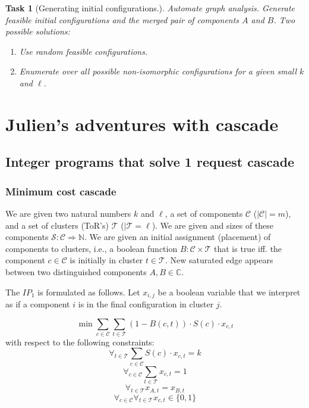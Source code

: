 \documentclass[a4paper,USenglish]{lipics-v2019}
\newtheorem{task}{Task}
\begin{document}
\begin{task}[Generating initial configurations.]

Automate graph analysis. Generate feasible initial configurations and the
merged pair of components $A$ and $B$. Two
possible solutions:
\begin{enumerate}
    \item Use
random feasible configurations.
\item Enumerate over all possible non-isomorphic configurations for a given small $k$
    and $\ell$.
\end{enumerate}
\end{task}


\section{Julien's adventures with cascade}

\subsection{Integer programs that solve 1 request cascade}

\subsubsection{Minimum cost cascade}

We are given two natural numbers $k$ and $\ell$, a set of components $\mathcal{C}$ ($|\mathcal{C}| = m$), and a set of clusters (ToR's) $\mathcal{T}$ ($|\mathcal{T} = \ell$).
We are given and sizes of these components $\mathcal{S} : \mathcal{C} \Rightarrow \mathbb{N}$.
We are given an initial assignment (placement) of components to clusters, i.e., a boolean function $B : \mathcal{C} \times \mathcal{T}$ that is true iff. the component $c \in \mathcal{C}$ is initially in cluster $t \in \mathcal{T}$.
New saturated edge appears between two distinguished components $A, B \in \mathbb{C}$.

The $IP_1$ is formulated as follows.
Let $x_{i,j}$ be a boolean variable that we interpret as if a component $i$ is in the final configuration in cluster $j$.

\[
    \min \sum_{c \in \mathcal{C}} \sum_{t \in \mathcal{T}} (1-B(c, t)) \cdot S(c) \cdot x_{c,t} 
\]
with respect to the following constraints:
\begin{equation}
  \forall_{t\in \mathcal{T}} \sum_{c \in \mathcal{C}} S(c) \cdot x_{c,t} = k
  \label{eq:capacity-constraints-ip1}
\end{equation}
\begin{equation}
    \forall_{c\in \mathcal{C}} \sum_{t \in \mathcal{T}} x_{c,t} = 1
    \label{eq:constraint-single-placement-ip1}
\end{equation}
\begin{equation}
    \forall_{t \in \mathcal{T}} x_{A,t} = x_{B, t}
    \label{eq:constraint-merge-ip1}
\end{equation}
\begin{equation}
    \forall_{c\in \mathcal{C}} \forall_{t\in \mathcal{T}} x_{c, t} \in \{ 0, 1 \}
\end{equation}
\end{document}
